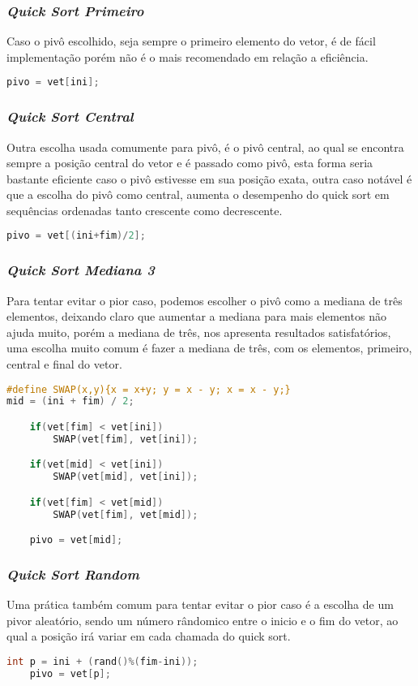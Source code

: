 \documentclass[
	12pt,				%
	oneside,			%
	a4paper,			%
	english,			%
	brazil,				%
	]{article}
\begin{document}
\subsubsection{\textit{Quick Sort Primeiro}}
Caso o pivô escolhido, seja sempre o primeiro elemento do vetor, é de fácil implementação porém não é o mais recomendado em relação a eficiência.
\begin{lstlisting}[language=C, caption=Estrutura \textit{Quick}]
  pivo = vet[ini];
\end{lstlisting}

\subsubsection{\textit{Quick Sort Central}}
Outra escolha usada comumente para pivô, é o pivô central, ao qual se encontra sempre a posição central do vetor e é passado como pivô, esta forma seria bastante 
eficiente caso o pivô estivesse em sua posição exata, outra caso notável é que a escolha do pivô como  central, aumenta o desempenho do quick sort em sequências ordenadas 
tanto crescente como decrescente.
\begin{lstlisting}[language=C, caption=Estrutura \textit{Quick}]
pivo = vet[(ini+fim)/2];
\end{lstlisting}

\subsubsection{\textit{Quick Sort Mediana 3}}
Para tentar evitar o pior caso, podemos escolher o pivô como a mediana de três elementos, deixando claro que aumentar a mediana para mais elementos não ajuda muito,
porém a mediana de três, nos apresenta resultados satisfatórios, uma escolha muito comum é fazer a mediana de três, com os elementos, primeiro, central e final do 
vetor.
\begin{lstlisting}[language=C, caption=Estrutura \textit{Quick}]
#define SWAP(x,y){x = x+y; y = x - y; x = x - y;}
mid = (ini + fim) / 2;

    if(vet[fim] < vet[ini])
        SWAP(vet[fim], vet[ini]);

    if(vet[mid] < vet[ini])
        SWAP(vet[mid], vet[ini]);

    if(vet[fim] < vet[mid])
        SWAP(vet[fim], vet[mid]);

    pivo = vet[mid]; 
\end{lstlisting}

\subsubsection{\textit{Quick Sort Random}}
Uma prática também comum para tentar evitar o pior caso é a escolha de um pivor aleatório, sendo um número rândomico entre o inicio e o fim do vetor, ao qual a 
posição irá variar em cada chamada do quick sort.
\begin{lstlisting}[language=C, caption=Estrutura \textit{Quick}]
int p = ini + (rand()%(fim-ini));
	pivo = vet[p];
\end{lstlisting}
\end{document}
